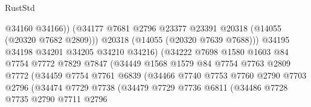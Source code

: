 \begin{lexlean}{RustStd}
\begin{coremodule}
                                        @34160
                                        @34166))
                                    (@34177
                                      @7681
                                      @2796
                                      @23377
                                      @23391
                                      @20318
                                      (@14055 (@20320 @7682 @2809)))
                                    @20318
                                    (@14055 (@20320 @7639 @7688)))
                                  @34195
                                  @34198
                                  @34201
                                  @34205
                                  @34210
                                  @34216)
                                (@34222
                                  @7698
                                  @1580
                                  @1603
                                  @84
                                  @7754
                                  @7772
                                  @7829
                                  @7847
                                  (@34449
                                    @1568
                                    @1579
                                    @84
                                    @7754
                                    @7763
                                    @2809
                                    @7772
                                    (@34459
                                      @7754
                                      @7761
                                      @6839
                                      (@34466
                                        @7740
                                        @7753
                                        @7760
                                        @2790
                                        @7703
                                        @2796
                                        (@34474
                                          @7729
                                          @7738
                                          (@34479
                                            @7729
                                            @7736
                                            @6811
                                            (@34486
                                              @7728
                                              @7735
                                              @2790
                                              @7711
                                              @2796

\end{coremodule}
\end{lexlean}

